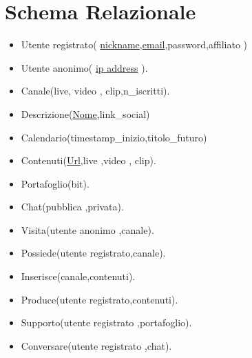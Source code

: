 \section{Schema Relazionale}
\begin{itemize}
    \item Utente registrato( \underline{nickname},\underline{email},password,affiliato  )
    \item Utente anonimo( \underline{ip address} ).
    \item Canale(live, video , clip,n_iscritti).
    \item Descrizione(\underline{Nome},link_social) 
    \item Calendario(timestamp_inizio,titolo_futuro)
    \item Contenuti(\underline{Url},live ,video , clip).
    \item Portafoglio(bit). 
    \item Chat(pubblica ,privata). 
    \item Visita(utente anonimo ,canale).
    \item Possiede(utente registrato,canale).
    \item Inserisce(canale,contenuti).
    \item Produce(utente registrato,contenuti).
    \item Supporto(utente registrato ,portafoglio).
    \item Conversare(utente registrato ,chat).
\end{itemize}